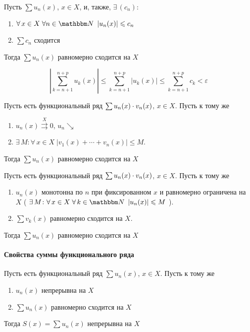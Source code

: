 \documentclass[12pt]{../../notes}
\begin{document}
\begin{thrm}\label{thrm:uniconvseriesweir}
  Пусть $\sum u_n(x)$, $x\in X$, и, также, $\exists\, (c_n) \colon$
  \begin{enumerate}
    \item $\forall\, x\in X \; \forall n\in \N \;\: |u_n(x)| \leqslant c_n$
    \item $\sum c_n$ сходится
  \end{enumerate}
  Тогда $\sum u_n(x) $ равномерно сходится на $X$
\end{thrm}
\begin{ittproof}
  \[
    \left| \sum_{k=n+1}^{n+p} u_k(x) \right| \leqslant\sum_{k=n+1}^{n+p}| u_k(x) | \leqslant \sum_{k=n+1}^{n+p} c_k 
    < \varepsilon
  \]
\end{ittproof}

\begin{thrm}\label{thrm:uniconvseriesdir}
  Пусть есть функциональный ряд $\sum u_n(x)\cdot\nolinebreak v_n(x)$, $x\in X$. Пусть к тому же
  \begin{enumerate}
    \item $u_n(x) \overset{X}{\rightrightarrows} 0 $, $u_n \searrow$
    \item $\exists\, M \colon \forall\, x\in X \; |v_1(x) + \dotsb + v_n(x)| \leqslant M$.
  \end{enumerate}
  Тогда $\sum u_n(x) $ равномерно сходится на $X$
\end{thrm}

\begin{thrm}\label{thrm:uniconvseriesabel}
  Пусть есть функциональный ряд $\sum u_n(x)\cdot\nolinebreak v_n(x)$, $x\in X$. Пусть к тому же
  \begin{enumerate}
    \item $u_n(x)$ монотонна по $n$ при фиксированном $x$ и равномерно ограничена на $X$ 
      ( $\exists\, M\colon \forall\, x \in X \; \forall\, k \in \N \;\: |u_n(x)| \leqslant M$ ).
    \item $\sum v_k(x)$ равномерно сходится на $X$.
  \end{enumerate}
  Тогда $\sum u_n(x) $ равномерно сходится на $X$
\end{thrm}

\paragraph{Свойства суммы функционального ряда}
\begin{thrm}\label{thrm:uniconvseriescont}
  Пусть есть функциональный ряд $\sum u_n(x)$, $x\in X$. Пусть к тому же
  \begin{enumerate}
    \item $u_n(x)$ непрерывна на $X$
    \item $\sum u_n(x)$ равномерно сходится на $X$
  \end{enumerate}
  Тогда $S(x) = \sum u_n(x)$ непрерывна на $X$
\end{thrm}
\end{document}
